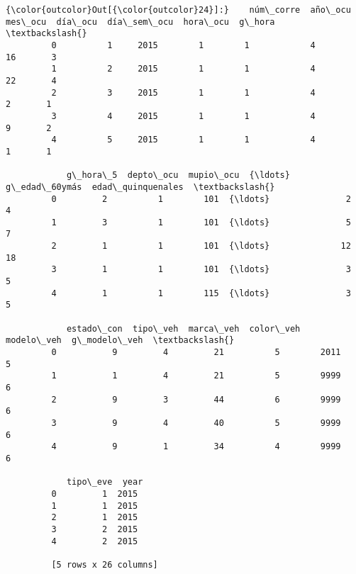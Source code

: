 \documentclass[11pt]{article}
\begin{document}
\begin{Verbatim}[commandchars=\\\{\}]
{\color{outcolor}Out[{\color{outcolor}24}]:}    núm\_corre  año\_ocu  mes\_ocu  día\_ocu  día\_sem\_ocu  hora\_ocu  g\_hora  \textbackslash{}
         0          1     2015        1        1            4        16       3   
         1          2     2015        1        1            4        22       4   
         2          3     2015        1        1            4         2       1   
         3          4     2015        1        1            4         9       2   
         4          5     2015        1        1            4         1       1   
         
            g\_hora\_5  depto\_ocu  mupio\_ocu  {\ldots}   g\_edad\_60ymás  edad\_quinquenales  \textbackslash{}
         0         2          1        101  {\ldots}               2                  4   
         1         3          1        101  {\ldots}               5                  7   
         2         1          1        101  {\ldots}              12                 18   
         3         1          1        101  {\ldots}               3                  5   
         4         1          1        115  {\ldots}               3                  5   
         
            estado\_con  tipo\_veh  marca\_veh  color\_veh  modelo\_veh  g\_modelo\_veh  \textbackslash{}
         0           9         4         21          5        2011             5   
         1           1         4         21          5        9999             6   
         2           9         3         44          6        9999             6   
         3           9         4         40          5        9999             6   
         4           9         1         34          4        9999             6   
         
            tipo\_eve  year  
         0         1  2015  
         1         1  2015  
         2         1  2015  
         3         2  2015  
         4         2  2015  
         
         [5 rows x 26 columns]
\end{Verbatim}
            
\end{document}
